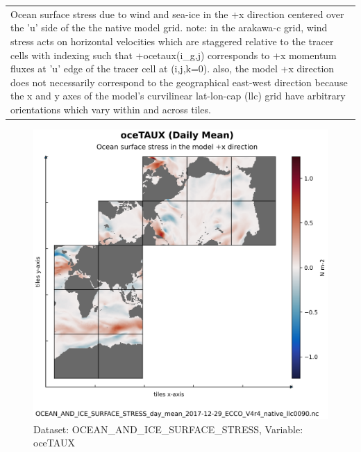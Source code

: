 \begin{longtable}{|m{}|m{}|m{}|m{}|}
\rowcolor{lightgray} \multicolumn{4}{|c|}{\textbf{Comments}} \\ \hline
\multicolumn{4}{|p{1\textwidth}|}{Ocean surface stress due to wind and sea-ice in the +x direction centered over the 'u' side of the the native model grid. note: in the arakawa-c grid, wind stress acts on horizontal velocities which are staggered relative to the tracer cells with indexing such that +ocetaux(i\_g,j) corresponds to +x momentum fluxes at 'u' edge of the tracer cell at (i,j,k=0). also, the model +x direction does not necessarily correspond to the geographical east-west direction because the x and y axes of the model's curvilinear lat-lon-cap (llc) grid have arbitrary orientations which vary within and across tiles.} \\ \hline
\end{longtable}

\begin{figure}[H]
\centering
\includegraphics[scale=0.55]{../images/plots/native_plots/Ocean_and_Sea-Ice_Surface_Stress/oceTAUX.png}
\caption{Dataset: OCEAN\_AND\_ICE\_SURFACE\_STRESS, Variable: oceTAUX}
\label{tab:table-OCEAN_AND_ICE_SURFACE_STRESS_oceTAUX-Plot}
\end{figure}
\pagebreak
